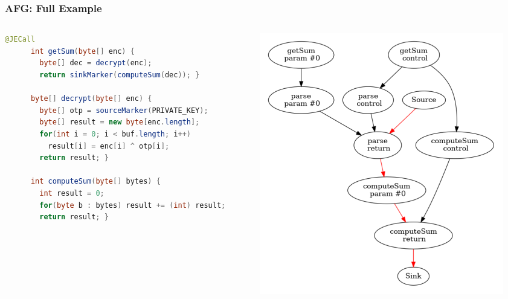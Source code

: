 \documentclass{beamer}
\begin{document}
\begin{frame}[fragile]
  \frametitle{AFG: Full Example}
  \begin{columns}
    \begin{column}{0.5\textwidth}
      \begin{lstlisting}[language=java, style=j, gobble=6, tabsize=2, basicstyle=\ttfamily\tiny]
      @JECall
      int getSum(byte[] enc) {
        byte[] dec = decrypt(enc);
        return sinkMarker(computeSum(dec)); }

      byte[] decrypt(byte[] enc) {
        byte[] otp = sourceMarker(PRIVATE_KEY);
        byte[] result = new byte[enc.length];
        for(int i = 0; i < buf.length; i++)
          result[i] = enc[i] ^ otp[i];
        return result; }

      int computeSum(byte[] bytes) {
        int result = 0;
        for(byte b : bytes) result += (int) result;
        return result; }
      \end{lstlisting}
    \end{column}
    \begin{column}{0.5\textwidth}
      \includegraphics[scale=0.4]{screenshot20201217010535.png}
    \end{column}
  \end{columns}
\end{frame}
\end{document}
